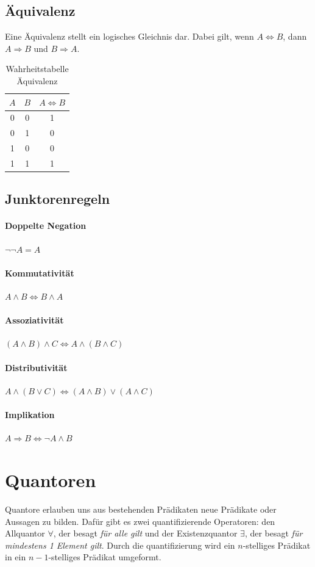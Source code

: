 \documentclass{article}
\begin{document}
\subsection{Äquivalenz}
Eine Äquivalenz stellt ein logisches Gleichnis dar. Dabei gilt, wenn \(A \Leftrightarrow B\), dann \(A \Rightarrow B\) und \(B \Rightarrow A\).
\begin{table}[h!]
		\begin{center}
				\caption{Wahrheitstabelle Äquivalenz}
				\label{tab:}
				\begin{tabular}{c c|c}
						\(A\) & \(B\) & \(A \Leftrightarrow B\) \\
						\hline
						0 & 0 & 1\\
						0 & 1 & 0\\
						1 & 0 & 0\\
						1 & 1 & 1\\
				\end{tabular}
		\end{center}
\end{table}
\subsection{Junktorenregeln}
\paragraph{Doppelte Negation}\(\neg \neg A = A\)
\paragraph{Kommutativität} \(A \wedge B \Leftrightarrow B \wedge A\)
\paragraph{Assoziativität} \((A \wedge B) \wedge C \Leftrightarrow A \wedge (B \wedge C)\)
\paragraph{Distributivität} \(A \wedge (B \vee C) \Leftrightarrow (A \wedge B) \vee (A \wedge C)\)
\paragraph{Implikation} \(A \Rightarrow B \Leftrightarrow \neg A \wedge B\)

\section{Quantoren}
Quantore erlauben uns aus bestehenden Prädikaten neue Prädikate oder Aussagen zu bilden. Dafür gibt es zwei quantifizierende Operatoren: den Allquantor \(\forall\), der besagt \textit{für alle gilt} und der Existenzquantor \(\exists\), der besagt \textit{für mindestens 1 Element gilt}. Durch die quantifizierung wird ein \(n\)-stelliges Prädikat in ein \(n-1\)-stelliges Prädikat umgeformt.
\end{document}
